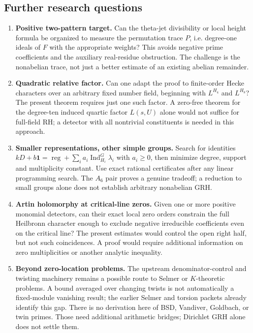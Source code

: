 \documentclass[11pt,letterpaper]{article}
\theoremstyle{remark}\newtheorem{remark}[theorem]{Remark}
\newcommand{\Ind}{\operatorname{Ind}}\newcommand{\Res}{\operatorname{Res}}\newcommand{\ord}{\operatorname{ord}}\newcommand{\reg}{\operatorname{reg}}\newcommand{\Gal}{\operatorname{Gal}}\newcommand{\Frob}{\operatorname{Frob}}\newcommand{\one}{\mathbf1}\newcommand{\RH}{\mathrm{RH}}
\begin{document}
\subsection{Further research questions}
\begin{enumerate}[label=\textbf{R\arabic*.}]
\item \textbf{Positive two-pattern target.} Can the theta-jet divisibility or local height formula be organized to measure the permutation trace $P$, i.e. degree-one ideals of $F$ with the appropriate weights? This avoids negative prime coefficients and the auxiliary real-residue obstruction. The challenge is the nonabelian trace, not just a better estimate of an existing abelian remainder.
\item \textbf{Quadratic relative factor.} Can one adapt the proof to finite-order Hecke characters over an arbitrary fixed number field, beginning with $L^{H_4}$ and $L^{H_8}$? The present theorem requires just one such factor. A zero-free theorem for the degree-ten induced quartic factor $L(s,U)$ alone would not suffice for full-field RH; a detector with all nontrivial constituents is needed in this approach.
\item \textbf{Smaller representations, other simple groups.} Search for identities $kD+b\one=\reg+\sum_i a_i\Ind_{H_i}^G\lambda_i$ with $a_i\ge0$, then minimize degree, support and multiplicity constant. Use exact rational certificates after any linear programming search. The $A_6$ pair proves a genuine tradeoff; a reduction to small groups alone does not establish arbitrary nonabelian GRH.
\item \textbf{Artin holomorphy at critical-line zeros.} Given one or more positive monomial detectors, can their exact local zero orders constrain the full Heilbronn character enough to exclude negative irreducible coefficients even on the critical line? The present estimates would control the open right half, but not such coincidences. A proof would require additional information on zero multiplicities or another analytic inequality.
\item \textbf{Beyond zero-location problems.} The upstream denominator-control and twisting machinery remains a possible route to Selmer or $K$-theoretic problems. A bound averaged over changing twists is not automatically a fixed-module vanishing result; the earlier Selmer and torsion packets already identify this gap. There is no derivation here of BSD, Vandiver, Goldbach, or twin primes. Those need additional arithmetic bridges; Dirichlet GRH alone does not settle them.
\end{enumerate}
\end{document}
